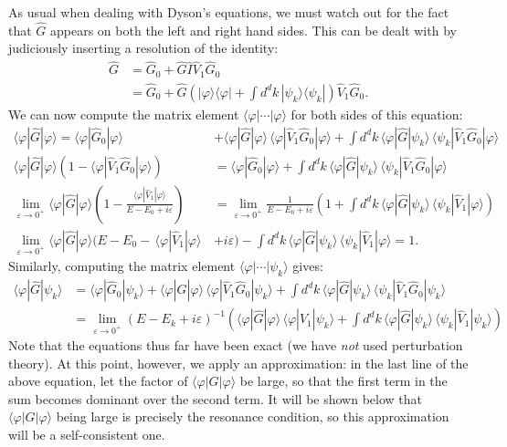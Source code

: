 \documentclass[pra,12pt]{revtex4}
\begin{document}
As usual when dealing with Dyson's equations, we must watch out for
the fact that $\hat{G}$ appears on both the left and right hand sides.
This can be dealt with by judiciously inserting a resolution of the
identity:
$$\begin{aligned}\hat{G} &= \hat{G}_0 + \hat{G} \hat{I} \hat{V}_1 \hat{G}_0 \\ &= \hat{G}_0 + \hat{G} \left(|\varphi\rangle\langle\varphi| + \int d^dk\, |\psi_k\rangle\langle\psi_k|\right) \hat{V}_1 \hat{G}_0. \end{aligned}$$
We can now compute the matrix element
$\langle\varphi|\cdots|\varphi\rangle$ for both sides of this equation:
$$\begin{aligned}\langle\varphi|\hat{G}|\varphi\rangle = \langle\varphi|\hat{G}_0|\varphi\rangle &+ \langle\varphi|\hat{G}|\varphi\rangle \, \langle\varphi|\hat{V}_1 \hat{G}_0|\varphi\rangle + \int d^dk\, \langle\varphi|\hat{G}|\psi_k\rangle \, \langle\psi_k| \hat{V}_1 \hat{G}_0|\varphi\rangle \\
\langle\varphi|\hat{G}|\varphi\rangle \left(1 - \langle\varphi|\hat{V}_1 \hat{G}_0|\varphi\rangle\right) &= \langle\varphi|\hat{G}_0|\varphi\rangle + \int d^dk\, \langle\varphi|\hat{G}|\psi_k\rangle \, \langle\psi_k| \hat{V}_1 \hat{G}_0|\varphi\rangle \\ \lim_{\varepsilon\rightarrow0^+}
\langle\varphi|\hat{G}|\varphi\rangle \left(1 - \frac{\langle\varphi|\hat{V}_1|\varphi\rangle}{E - E_0 + i\varepsilon}\right) &= \lim_{\varepsilon\rightarrow0^+} \frac{1}{E  - E_0 + i\varepsilon} \left(1+ \int d^dk\, \langle\varphi|\hat{G}|\psi_k\rangle \, \langle\psi_k| \hat{V}_1|\varphi\rangle \right) \\
\lim_{\varepsilon\rightarrow0^+} \langle\varphi|\hat{G}|\varphi\rangle \Big(E - E_0 -\, \langle\varphi|\hat{V}_1|\varphi\rangle \, & + i\varepsilon\Big) - \int d^dk\, \langle\varphi|\hat{G}|\psi_k\rangle \, \langle\psi_k| \hat{V}_1|\varphi\rangle = 1.\end{aligned}$$
Similarly, computing the matrix element
$\langle\varphi|\cdots|\psi_k\rangle$ gives:
$$\begin{aligned}
\langle\varphi|\hat{G}|\psi_k\rangle &= \langle\varphi|\hat{G}_0|\psi_k\rangle + \langle\varphi|\hat{G}|\varphi\rangle \, \langle\varphi|\hat{V}_1 \hat{G}_0|\psi_k\rangle + \int d^dk\, \langle\varphi|\hat{G}|\psi_k\rangle \, \langle\psi_k| \hat{V}_1 \hat{G}_0|\psi_k\rangle \\
&= \lim_{\varepsilon\rightarrow0^+} \left(E-E_k+i\varepsilon\right)^{-1} \left(\langle\varphi|\hat{G}|\varphi\rangle \, \langle\varphi|\hat{V}_1|\psi_k\rangle + \int d^dk\, \langle\varphi|\hat{G}|\psi_k\rangle \, \langle\psi_k| \hat{V}_1|\psi_k\rangle\right)\end{aligned}$$
Note that the equations thus far have been exact (we have \textit{not}
used perturbation theory).  At this point, however, we apply an
approximation: in the last line of the above equation, let the factor
of $\langle\varphi|G|\varphi\rangle$ be large, so that the first term
in the sum becomes dominant over the second term.  It will be shown
below that $\langle\varphi|G|\varphi\rangle$ being large is precisely
the resonance condition, so this approximation will be a
self-consistent one.
\end{document}
